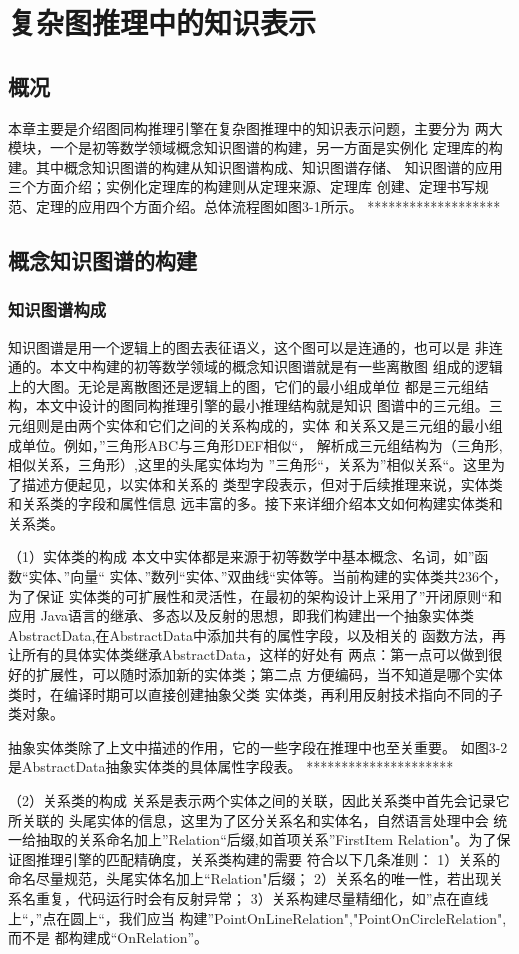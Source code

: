 \documentclass{standalone}
\begin{document}
\chapter{复杂图推理中的知识表示}
\section{概况}
本章主要是介绍图同构推理引擎在复杂图推理中的知识表示问题，主要分为
两大模块，一个是初等数学领域概念知识图谱的构建，另一方面是实例化
定理库的构建。其中概念知识图谱的构建从知识图谱构成、知识图谱存储、
知识图谱的应用三个方面介绍；实例化定理库的构建则从定理来源、定理库
创建、定理书写规范、定理的应用四个方面介绍。总体流程图如图3-1所示。
*******************
\section{概念知识图谱的构建}
\subsection{知识图谱构成}
知识图谱是用一个逻辑上的图去表征语义，这个图可以是连通的，也可以是
非连通的。本文中构建的初等数学领域的概念知识图谱就是有一些离散图
组成的逻辑上的大图。无论是离散图还是逻辑上的图，它们的最小组成单位
都是三元组结构，本文中设计的图同构推理引擎的最小推理结构就是知识
图谱中的三元组。三元组则是由两个实体和它们之间的关系构成的，实体
和关系又是三元组的最小组成单位。例如，”三角形ABC与三角形DEF相似“，
解析成三元组结构为（三角形,相似关系，三角形）,这里的头尾实体均为
”三角形“，关系为”相似关系“。这里为了描述方便起见，以实体和关系的
类型字段表示，但对于后续推理来说，实体类和关系类的字段和属性信息
远丰富的多。接下来详细介绍本文如何构建实体类和关系类。

（1）实体类的构成
本文中实体都是来源于初等数学中基本概念、名词，如”函数“实体、”向量“
实体、”数列“实体、”双曲线“实体等。当前构建的实体类共236个，为了保证
实体类的可扩展性和灵活性，在最初的架构设计上采用了”开闭原则“和应用
Java语言的继承、多态以及反射的思想，即我们构建出一个抽象实体类
AbstractData,在AbstractData中添加共有的属性字段，以及相关的
函数方法，再让所有的具体实体类继承AbstractData，这样的好处有
两点：第一点可以做到很好的扩展性，可以随时添加新的实体类；第二点
方便编码，当不知道是哪个实体类时，在编译时期可以直接创建抽象父类
实体类，再利用反射技术指向不同的子类对象。

抽象实体类除了上文中描述的作用，它的一些字段在推理中也至关重要。
如图3-2是AbstractData抽象实体类的具体属性字段表。
*********************

（2）关系类的构成
关系是表示两个实体之间的关联，因此关系类中首先会记录它所关联的
头尾实体的信息，这里为了区分关系名和实体名，自然语言处理中会
统一给抽取的关系命名加上”Relation“后缀,如首项关系”FirstItem
Relation"。为了保证图推理引擎的匹配精确度，关系类构建的需要
符合以下几条准则：
1）关系的命名尽量规范，头尾实体名加上“Relation"后缀；
2）关系名的唯一性，若出现关系名重复，代码运行时会有反射异常；
3）关系构建尽量精细化，如”点在直线上“，”点在圆上“，我们应当
构建”PointOnLineRelation","PointOnCircleRelation",而不是
都构建成“OnRelation”。
\end{document}
